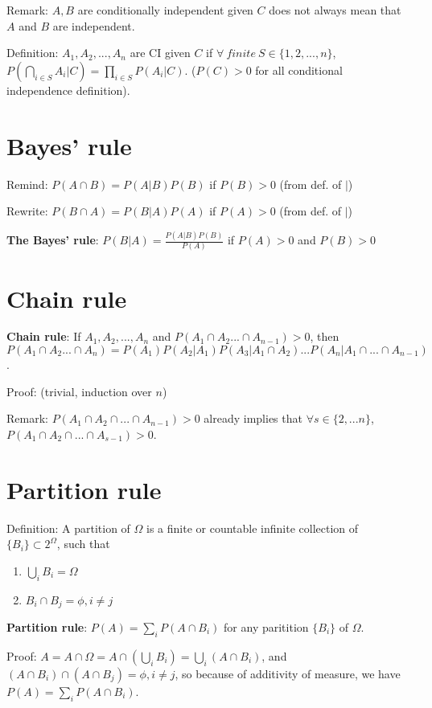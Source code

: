 \documentclass[12pt]{article}
\begin{document}
Remark: $A,B$ are conditionally independent given $C$ does not always mean that $A$ and $B$
are independent.
\bigbreak

Definition: $A_1, A_2,...,A_n$ are CI given $C$ if $\forall\ finite\ S\in \{1,2,...,n\}$,
$P(\bigcap\limits_{i\in S} A_i|C)=\prod\limits_{i\in S} P(A_i|C)$. ($P(C) > 0$ for all conditional
independence definition).

\section{Bayes' rule}

Remind: $P(A\cap B) = P(A|B)P(B)$ if $P(B) > 0$ (from def. of $|$)

Rewrite: $P(B\cap A) = P(B|A) P(A)$ if $P(A) > 0$ (from def. of $|$)
\bigbreak

\textbf{The Bayes' rule}: $P(B|A)=\frac{P(A|B)P(B)}{P(A)}$ if $P(A)>0$ and $P(B)>0$

\section{Chain rule}

\textbf{Chain rule}: If $A_1,A_2,...,A_n$ and $P(A_1\cap A_2...\cap A_{n-1}) > 0$,
then $P(A_1\cap A_2...\cap A_n) = P(A_1)P(A_2|A_1)P(A_3|A_1\cap A_2)...P(A_n|A_1\cap ... \cap A_{n-1})$.

Proof: (trivial, induction over $n$)

Remark: $P(A_1\cap A_2\cap ... \cap A_{n-1})>0$ already implies that $\forall s\in \{2,...n\}$,
$P(A_1\cap A_2\cap ...\cap A_{s-1}) > 0$.

\section{Partition rule}

Definition: A partition of $\Omega$ is a finite or countable infinite collection
of $\{B_i\}\subset 2^{\Omega}$, such that
\begin{enumerate}
    \item $\bigcup\limits_i B_i = \Omega$
    \item $B_i\cap B_j = \phi, i\neq j$
\end{enumerate}

\textbf{Partition rule}: $P(A) = \sum\limits_i P(A\cap B_i)$ for any paritition $\{B_i\}$ of $\Omega$.

Proof: $A=A\cap \Omega=A\cap (\bigcup\limits_i B_i)=\bigcup\limits_i (A\cap B_i)$, and
$(A\cap B_i)\cap (A\cap B_j)=\phi, i\neq j$, so because of additivity of measure,
we have $P(A) = \sum\limits_i P(A\cap B_i)$.
\end{document}
